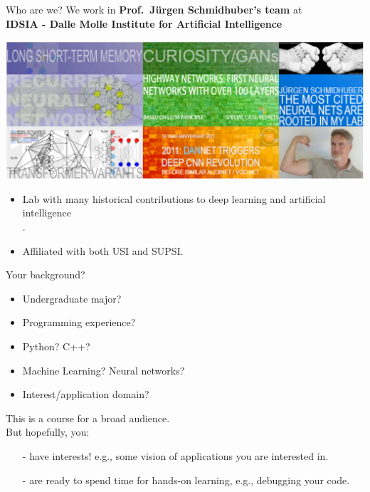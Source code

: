 \begin{frame}{Who are we?}
We work in \textbf{Prof.~J\"urgen Schmidhuber's team} at\\
\vsp
\textbf{IDSIA - Dalle Molle Institute for Artificial Intelligence}
\begin{center}
    \includegraphics[height=0.5\textheight]{figures/idsia_lab.png}
\end{center}
\begin{itemize}
\item Lab with many historical contributions to deep learning and artificial intelligence\\
.
\item Affiliated with both USI and SUPSI.
\end{itemize}
\end{frame}

\begin{frame}{Your background?}
  \begin{itemize}
\item Undergraduate major?
\item Programming experience?
\item Python? C++?
\item Machine Learning? Neural networks?
\item Interest/application domain?
\end{itemize}
\vspace{2mm}
\pause
This is a course for a broad audience.\\
\vspace{2mm}
But hopefully, you:
\begin{itemize}
\item[-] have interests! e.g., some vision of applications you are interested in.
\item[-] are ready to spend time for hands-on learning, e.g., debugging your code.
\end{itemize}
\end{frame}


